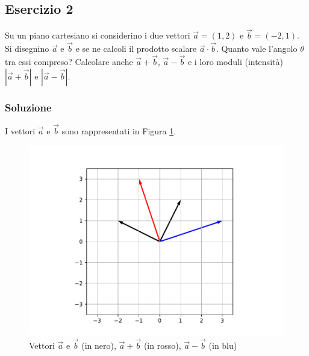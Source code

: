 \documentclass[12pt,a4paper]{book}
\begin{document}
\subsection*{Esercizio 2}
Su un piano cartesiano si considerino i due vettori $\vec{a}=(1,2)$ e $\vec{b}=(-2,1)$. Si disegnino $\vec{a}$ e $\vec{b}$ e se ne calcoli il prodotto scalare $\vec{a}\cdot \vec{b}$. Quanto vale l'angolo $\theta$ tra essi compreso? Calcolare anche $\vec{a}+\vec{b}$, $\vec{a}-\vec{b}$ e i loro moduli (intensità) $|\vec{a}+\vec{b}|$ e $|\vec{a}-\vec{b}|$.
\subsubsection*{Soluzione}
I vettori $\vec{a}$ e $\vec{b}$ sono rappresentati in Figura \ref{fig:vettori1}.


 \begin{figure}[!ht]
\centering
\includegraphics[scale=0.6]{vettori1.pdf}
\caption{Vettori $\vec{a}$ e $\vec{b}$ (in nero), $\vec{a}+\vec{b}$ (in rosso), $\vec{a}-\vec{b}$ (in blu) }
\label{fig:vettori1}
\end{figure}
\end{document}
